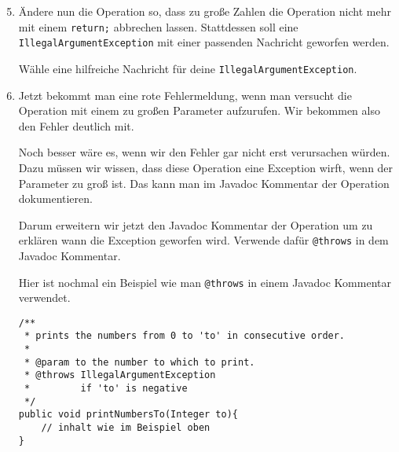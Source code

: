 \begin{enumerate}\setcounter{enumi}{4}
	\item
		Ändere nun die Operation so, dass zu große Zahlen die Operation nicht mehr mit einem \lstinline{return;} abbrechen lassen.
		Stattdessen soll eine \lstinline{IllegalArgumentException} mit einer passenden Nachricht geworfen werden.

		Wähle eine hilfreiche Nachricht für deine \lstinline{IllegalArgumentException}.

	\item
		Jetzt bekommt man eine rote Fehlermeldung, wenn man versucht die Operation mit einem zu großen Parameter aufzurufen.
		Wir bekommen also den Fehler deutlich mit.

		Noch besser wäre es, wenn wir den Fehler gar nicht erst verursachen würden.
		Dazu müssen wir wissen, dass diese Operation eine Exception wirft, wenn der Parameter zu groß ist.
		Das kann man im Javadoc Kommentar der Operation dokumentieren.
		
		Darum erweitern wir jetzt den Javadoc Kommentar der Operation um zu erklären wann die Exception geworfen wird. 
		Verwende dafür \lstinline{@throws} in dem Javadoc Kommentar.

		Hier ist nochmal ein Beispiel wie man \lstinline{@throws} in einem Javadoc Kommentar verwendet.

		\begin{lstlisting}
/**
 * prints the numbers from 0 to 'to' in consecutive order.
 * 
 * @param to the number to which to print.
 * @throws IllegalArgumentException
 *         if 'to' is negative
 */
public void printNumbersTo(Integer to){
    // inhalt wie im Beispiel oben
}
		\end{lstlisting}
\end{enumerate}
\newpage

